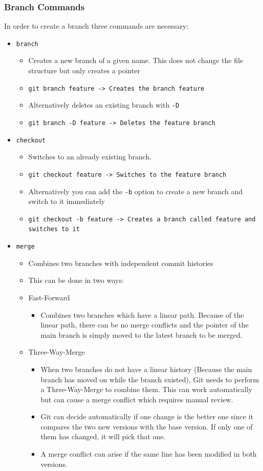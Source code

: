\documentclass{article}
\begin{document}
	\subsubsection{Branch Commands}
	In order to create a branch three commands are necessary:
	\begin{itemize}
		\item{\texttt{branch}}
		\begin{itemize}
			\item{Creates a new branch of a given name. This does not change the file structure but only creates a pointer}
			\item{\texttt{git branch feature -> Creates the branch feature}}
			\item{Alternatively deletes an existing branch with \texttt{-D}}
			\item{\texttt{git branch -D feature -> Deletes the feature branch}}
		\end{itemize}
		\item{\texttt{checkout}}
		\begin{itemize}
			\item{Switches to an already existing branch.}
			\item{\texttt{git checkout feature -> Switches to the feature branch}}
			\item{Alternatively you can add the \texttt{-b} option to create a new branch and switch to it immediately}
			\item{\texttt{git checkout -b feature -> Creates a branch called feature and switches to it}}
		\end{itemize}
		\item{\texttt{merge}}
		\begin{itemize}
			\item{Combines two branches with independent commit histories}
			\item{This can be done in two ways:}
			\item{Fast-Forward}
			\begin{itemize}
				\item{Combines two branches which have a linear path. Because of the linear path, there can be no merge conflicts and the pointer of the main branch is simply moved to the latest branch to be merged.}
			\end{itemize}
			\item{Three-Way-Merge}
			\begin{itemize}
				\item{When two branches do not have a linear history (Because the main branch has moved on while the branch existed), Git needs to perform a Three-Way-Merge to combine them. This can work automatically but can cause a merge conflict which requires manual review.}
				\item{Git can decide automatically if one change is the better one since it compares the two new versions with the base version. If only one of them has changed, it will pick that one.}
				\item{A merge conflict can arise if the same line has been modified in both versions.}
			\end{itemize}
		\end{itemize}
	\end{itemize}
\end{document}
